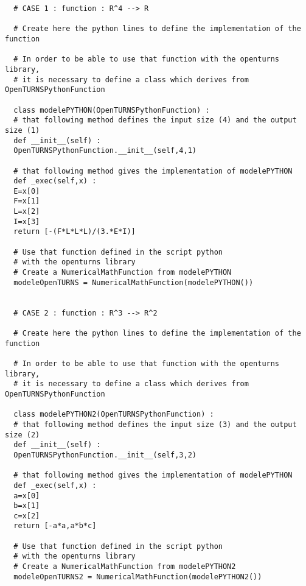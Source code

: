 \begin{lstlisting}
  # CASE 1 : function : R^4 --> R

  # Create here the python lines to define the implementation of the function

  # In order to be able to use that function with the openturns library,
  # it is necessary to define a class which derives from OpenTURNSPythonFunction

  class modelePYTHON(OpenTURNSPythonFunction) :
  # that following method defines the input size (4) and the output size (1)
  def __init__(self) :
  OpenTURNSPythonFunction.__init__(self,4,1)

  # that following method gives the implementation of modelePYTHON
  def _exec(self,x) :
  E=x[0]
  F=x[1]
  L=x[2]
  I=x[3]
  return [-(F*L*L*L)/(3.*E*I)]

  # Use that function defined in the script python
  # with the openturns library
  # Create a NumericalMathFunction from modelePYTHON
  modeleOpenTURNS = NumericalMathFunction(modelePYTHON())


  # CASE 2 : function : R^3 --> R^2

  # Create here the python lines to define the implementation of the function

  # In order to be able to use that function with the openturns library,
  # it is necessary to define a class which derives from OpenTURNSPythonFunction

  class modelePYTHON2(OpenTURNSPythonFunction) :
  # that following method defines the input size (3) and the output size (2)
  def __init__(self) :
  OpenTURNSPythonFunction.__init__(self,3,2)

  # that following method gives the implementation of modelePYTHON
  def _exec(self,x) :
  a=x[0]
  b=x[1]
  c=x[2]
  return [-a*a,a*b*c]

  # Use that function defined in the script python
  # with the openturns library
  # Create a NumericalMathFunction from modelePYTHON2
  modeleOpenTURNS2 = NumericalMathFunction(modelePYTHON2())
\end{lstlisting}

